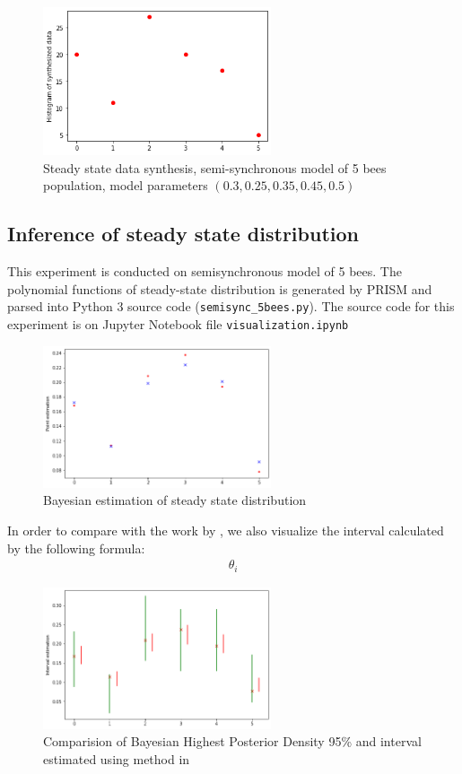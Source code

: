 \documentclass[12pt]{article}
\theoremstyle{definition}
\begin{document}
\begin{figure}[H]
  \centering
  \includegraphics[width=0.6\textwidth,keepaspectratio]{figures/data_synthesis.png}
  \caption{Steady state data synthesis, semi-synchronous model of 5 bees
    population, model parameters $(0.3, 0.25, 0.35, 0.45, 0.5)$}
\end{figure}

\subsection{Inference of steady state distribution}
This experiment is conducted on semisynchronous model of 5 bees. The polynomial
functions of steady-state distribution is generated by PRISM and parsed into
Python 3 source code
(\texttt{semisync\_5bees.py}). The source code for this
experiment is on Jupyter Notebook file \texttt{visualization.ipynb}
\begin{figure}[H]
  \centering
  \includegraphics[width=0.6\textwidth,keepaspectratio]{figures/point_estimation.png}
  \caption{Bayesian estimation of steady state distribution}
\end{figure}
In order to compare with the work by \cite{hajnal2019data}, we also visualize
the interval calculated by the following formula:
\begin{align*}
  \theta_i 
\end{align*}
\begin{figure}[H]
  \centering
  \includegraphics[width=0.6\textwidth,keepaspectratio]{figures/interval_estimation.png}
  \caption{Comparision of Bayesian Highest Posterior Density 95\% and interval
    estimated using method in \cite{hajnal2019data}}
\end{figure}
\end{document}
